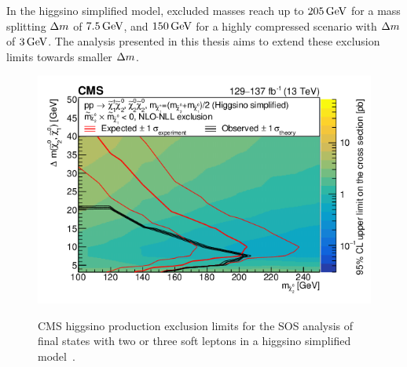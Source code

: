 In the higgsino simplified model, excluded masses reach up to $205 \,\text{Ge\hspace{-.08em}V}$ for a mass splitting $\Delta m$ of $7.5 \,\text{Ge\hspace{-.08em}V}$, and $150 \,\text{Ge\hspace{-.08em}V}$ for a highly compressed scenario with $\Delta m$ of $3 \,\text{Ge\hspace{-.08em}V}$. The analysis presented in this thesis aims to extend these exclusion limits towards smaller $\Delta m$.

\begin{figure}[!htb]
\centering
\includegraphics[width=0.80\linewidth]{plots/prev_results/cms_sos_limit.png} \\
\caption[CMS SOS higgsino production exclusion limits]{CMS higgsino production exclusion limits for the SOS analysis of final states with two or three soft leptons in a higgsino simplified model~\cite{sos}.}
\label{fig:cms-sos-limits}
\end{figure}

